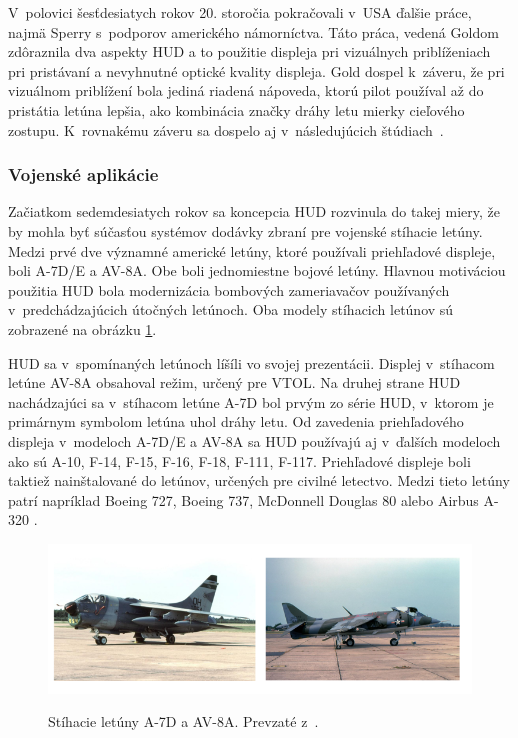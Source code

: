 V~polovici šesťdesiatych rokov 20. storočia pokračovali v~USA ďalšie práce, najmä Sperry s~podporov amerického námorníctva. Táto práca, vedená Goldom zdôraznila dva aspekty HUD a to použitie displeja pri vizuálnych priblíženiach pri pristávaní a nevyhnutné optické kvality displeja. Gold \cite{4502188} dospel k~záveru, že pri vizuálnom priblížení bola jediná riadená nápoveda, ktorú pilot používal až do pristátia letúna lepšia, ako kombinácia značky dráhy letu mierky cieľového zostupu. K~rovnakému záveru sa dospelo aj v~následujúcich štúdiach~\cite{39}.

\subsubsection{Vojenské aplikácie}
Začiatkom sedemdesiatych rokov sa koncepcia HUD rozvinula do takej miery, že by mohla byť súčasťou systémov dodávky zbraní pre vojenské stíhacie letúny. Medzi prvé dve významné americké letúny, ktoré používali priehľadové displeje, boli A-7D/E a AV-8A. Obe boli jednomiestne bojové letúny. Hlavnou motiváciou použitia HUD bola modernizácia bombových zameriavačov používaných v~predchádzajúcich útočných letúnoch. Oba modely stíhacich letúnov sú zobrazené na obrázku \ref{stihacky}.

HUD sa v~spomínaných letúnoch líšíli vo svojej prezentácii. Displej v~stíhacom letúne AV-8A obsahoval režim, určený pre VTOL. Na druhej strane HUD nachádzajúci sa v~stíhacom letúne A-7D bol prvým zo série HUD, v~ktorom je primárnym symbolom letúna uhol dráhy letu. Od zavedenia priehľadového displeja v~modeloch A-7D/E a AV-8A sa HUD používajú aj v~ďalších modeloch ako sú A-10, F-14, F-15, F-16, F-18, F-111, F-117. Priehľadové displeje boli taktiež nainštalované do letúnov, určených pre civilné letectvo. Medzi tieto letúny patrí napríklad Boeing 727, Boeing 737, McDonnell Douglas 80 alebo Airbus A-320 \cite{HUDkniha}.

\begin{figure}[ht]
\centering
\includegraphics[scale=0.7]{obrazky-figures/a7dav8a.png}
\caption{Stíhacie letúny A-7D a AV-8A. Prevzaté z~\cite{fotoStihacky}.}{\label{stihacky}}
\end{figure}

